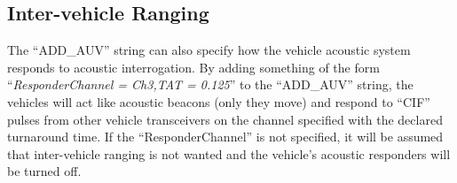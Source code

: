 \documentclass[a4paper,10pt]{article}
\begin{document}
\subsection{Inter-vehicle Ranging}
The ``ADD\_AUV'' string can also specify how the vehicle acoustic system
responds to acoustic interrogation. By adding something of the form
``{\it{ResponderChannel = Ch3,TAT = 0.125}}'' to the ``ADD\_AUV'' string,
the vehicles will act like acoustic beacons (only they move) and respond to ``CIF'' pulses
from other vehicle transceivers on the channel specified with the declared turnaround time.
If the ``ResponderChannel'' is not specified, it will be assumed that inter-vehicle ranging
is not wanted and the vehicle's acoustic responders will be turned off.
\end{document}
